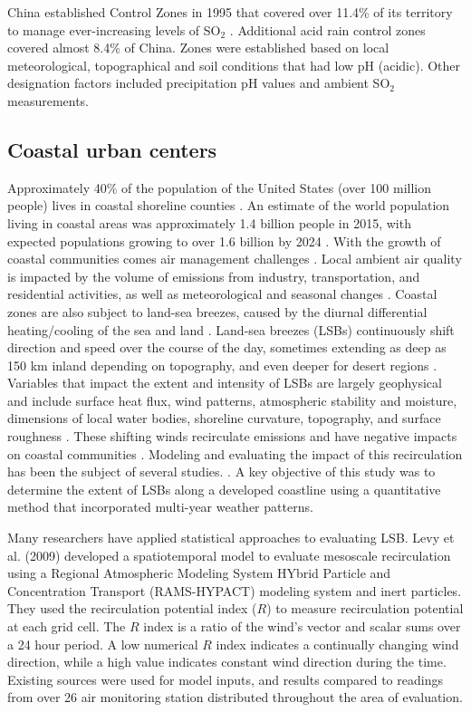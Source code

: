 China established Control Zones in 1995 that covered over 11.4\% of its territory to manage ever-increasing levels of SO$_{2}$ \citep{Hao2000}.  Additional acid rain control zones covered almost 8.4\% of China.  Zones were established based on local meteorological, topographical and soil conditions that had low pH (acidic).  Other designation factors included precipitation pH values and ambient SO$_{2}$ measurements.

\subsection{Coastal urban centers}

Approximately 40\% of the population of the United States (over 100 million people) lives in coastal shoreline counties \citep{NOAA2013}.  An estimate of the world population living in coastal areas was approximately 1.4 billion people in 2015, with expected populations growing to over 1.6 billion by 2024 \citep{Geohive2015}.  With the growth of coastal communities comes air management challenges \citep{Gamas2015}.  Local ambient air quality is impacted by the volume of emissions from industry, transportation, and residential activities, as well as meteorological and seasonal changes \citep{Fiore2015, Kimbrough2013}.  Coastal zones are also subject to land-sea breezes, caused by the diurnal differential heating/cooling of the sea and land \citep{Crosman2010, Cuxart2014, Tsai2011}.  Land-sea breezes (LSBs) continuously shift direction and speed over the course of the day, sometimes extending as deep as 150 km inland depending on topography, and even deeper for desert regions \citep{Miao2015, Zhu2004}.  Variables that impact the extent and intensity of LSBs are largely geophysical and include surface heat flux, wind patterns, atmospheric stability and moisture, dimensions of local water bodies, shoreline curvature, topography, and surface roughness \citep{Crosman2010, Lu1995}.  These shifting winds recirculate emissions and have negative impacts on coastal communities \citep{Lu1996}.  Modeling and evaluating the impact of this recirculation has been the subject of several studies. \citep{Crosman2010, Levy2009, Wu2013, Zhu2004}.  A key objective of this study was to determine the extent of LSBs along a developed coastline using a quantitative method that incorporated multi-year weather patterns. 

Many researchers have applied statistical approaches to evaluating LSB.  Levy et al. (2009) developed a spatiotemporal model to evaluate mesoscale recirculation using a Regional Atmospheric Modeling System HYbrid Particle and Concentration Transport (RAMS-HYPACT) modeling system and inert particles.  They used the recirculation potential index ($R$) to measure recirculation potential at each grid cell.  The $R$ index is a ratio of the wind’s vector and scalar sums over a 24 hour period.  A low numerical $R$ index indicates a continually changing wind direction, while a high value indicates constant wind direction during the time.  Existing sources were used for model inputs, and results compared to readings from over 26 air monitoring station distributed throughout the area of evaluation.  

